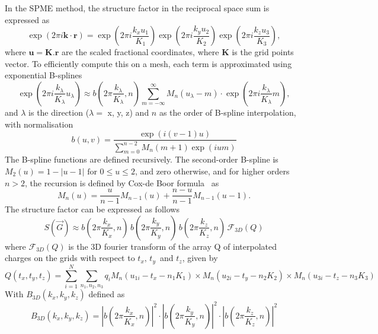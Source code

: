 In the \ac{SPME} method, the structure factor in the reciprocal space sum is expressed as
\begin{equation}
\exp(2\pi i \mathbf{k} \cdot \mathbf{r}) =
\exp\left(2\pi i \frac{k_x u_1}{K_1} \right)
\exp\left(2\pi i \frac{k_y u_2}{K_2} \right)
\exp\left(2\pi i \frac{k_z u_3}{K_3} \right),
\end{equation}
where $\mathbf{u} = \mathbf{K}.\mathbf{r}$ are the scaled fractional coordinates, where $\mathbf{K}$ is the grid points vector. To efficiently compute this on a mesh, each term is approximated using exponential B-splines
\begin{equation}
    \exp\left(2\pi i \frac{k_\lambda}{K_\lambda} u_\lambda\right) \approx 
    b \left(2\pi \frac{k_\lambda}{K_\lambda},n\right) \sum_{m=-\infty}^{\infty} M_n(u_\lambda - m) 
    \cdot \exp\left(2\pi i \frac{k_\lambda}{K_\lambda} m\right),\label{eq:bspline}
\end{equation}
and $\lambda$ is the direction ($\lambda = $ x, y, z) and $n$ as the order of B-spline interpolation, with normalisation
\begin{equation}
    b(u,v) = \frac{\exp\left(i (v - 1) u\right)}
       {\sum_{m=0}^{n-2} M_n(m+1) \exp\left(i um\right)}
\end{equation}
The B-spline functions are defined recursively. The second-order B-spline is 
$M_2(u) = 
1 - |u - 1| \text{ for } 0 \le u \le 2$, and zero otherwise, and for higher orders \( n > 2 \), the recursion is defined by Cox-de Boor formula~\cite{de1968uniform, de1972calculating} as 
\begin{equation}
M_n(u) = \frac{u}{n-1} M_{n-1}(u) + \frac{n - u}{n - 1} M_{n-1}(u - 1).
\end{equation}
The structure factor can be expressed as follows
\begin{equation}
    S(\vec{G}) \approx b\left(2\pi \frac{k_x}{K_x},n\right)\,b\left(2\pi \frac{k_y}{K_y},n\right)\,b\left(2\pi \frac{k_z}{K_z},n\right) \, \mathcal{F}_{3D}(Q)
\end{equation}
where $\mathcal{F}_{3D}(Q)$ is the 3D fourier transform of the array Q of interpolated charges on the grids with respect to $t_x,\,t_y\,$ and $t_z$, given by
\begin{equation}
    Q(t_x, t_y, t_z) =  \sum_{i=1}^{N} \sum_{n_1, n_2, n_3} q_i M_n(u_{1i} - t_x - n_1 K_1) \times M_n(u_{2i} - t_y - n_2 K_2) \times M_n(u_{3i} - t_z - n_3 K_3)
\end{equation}
With $ B_{3D}(k_x, k_y, k_z)$ defined as $$ B_{3D}(k_x, k_y, k_z) = \left| b\left(2\pi \frac{k_x}{K_x},n\right) \right|^2 \cdot \left| b\left(2\pi \frac{k_y}{K_y},n\right) \right|^2 \cdot \left| b\left(2\pi \frac{k_z}{K_z},n\right) \right|^2$$
